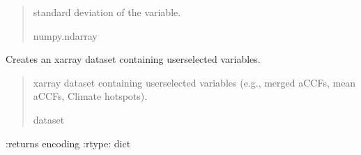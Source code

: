 \documentclass[a4paper,11pt,english]{sphinxmanual}
\begin{document}
\begin{fulllineitems}
\begin{fulllineitems}
\begin{quote}
\begin{description}
\sphinxAtStartPar
standard deviation of the variable.

\sphinxAtStartPar
numpy.ndarray

\end{description}\end{quote}

\end{fulllineitems}


\begin{fulllineitems}
\label{\detokenize{modules:envlib.accf.GeTaCCFs.get_xarray}}
\pysigstartsignatures
{}
\pysigstopsignatures
\sphinxAtStartPar
Creates an xarray dataset containing user\sphinxhyphen{}selected variables.
\begin{quote}\begin{description}
\sphinxAtStartPar
xarray dataset containing user\sphinxhyphen{}selected variables (e.g., merged aCCFs, mean aCCFs, Climate hotspots).

\sphinxAtStartPar
dataset

\end{description}\end{quote}

\sphinxAtStartPar
:returns encoding
:rtype: dict

\end{fulllineitems}


\end{fulllineitems}

\label{\detokenize{modules:module-envlib.accf}}
\end{document}
